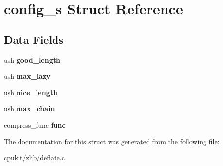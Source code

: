 \hypertarget{structconfig__s}{}\section{config\+\_\+s Struct Reference}
\label{structconfig__s}
\subsection*{Data Fields}
\begin{DoxyCompactItemize}
\item 
\mbox{\label{structconfig__s_a36152319fbe49bebbc0354f8bcb617a6}} 
ush {\bfseries good\+\_\+length}
\item 
\mbox{\label{structconfig__s_afecf50eeeb2afca11ab28d344280231b}} 
ush {\bfseries max\+\_\+lazy}
\item 
\mbox{\label{structconfig__s_af2a1e023e10d6e0c9ff64f8c0c4c9894}} 
ush {\bfseries nice\+\_\+length}
\item 
\mbox{\label{structconfig__s_ac0ef64600cf4487e3754a21934ffdb89}} 
ush {\bfseries max\+\_\+chain}
\item 
\mbox{\label{structconfig__s_aea5a0fe31d694079966523a49d60174b}} 
compress\+\_\+func {\bfseries func}
\end{DoxyCompactItemize}


The documentation for this struct was generated from the following file\+:\begin{DoxyCompactItemize}
\item 
cpukit/zlib/deflate.\+c\end{DoxyCompactItemize}
